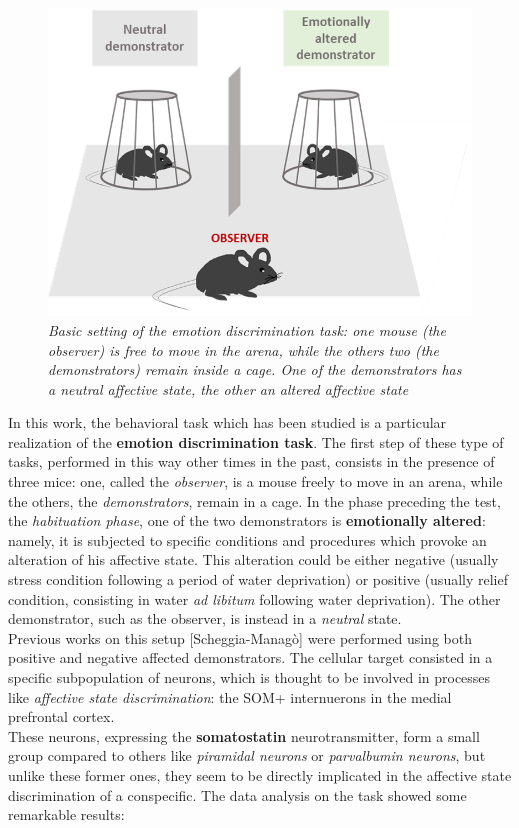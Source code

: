 \documentclass[a4paper]{article}
\begin{document}
\begin{figure}
	\begin{center}
		\includegraphics[scale=.60]{mice_task.png} 
	\end{center} 
	\caption{\textit{Basic setting of the emotion discrimination task: one mouse (the \textit{observer}) is free to move in the arena, while the others two (the \textit{demonstrators}) remain inside a cage. One of the demonstrators has a neutral affective state, the other an altered affective state}}
	
\end{figure}
In this work, the behavioral task which has been studied is a particular realization of the \textbf{emotion discrimination task}. The first step of these type of tasks, performed in this way other times in the past, consists in the presence of three mice: one, called the \textit{observer}, is a mouse freely to move in an arena, while the others, the \textit{demonstrators}, remain in a cage. In the phase preceding the test, the \textit{habituation phase}, one of the two demonstrators is \textbf{emotionally altered}: namely, it is subjected to specific conditions and procedures which provoke an alteration of his affective state. This alteration could be either negative (usually stress condition following a period of water deprivation) or positive (usually relief condition, consisting in water \textit{ad libitum} following water deprivation). The other demonstrator, such as the observer, is instead in a \textit{neutral} state.\\

Previous works on this setup [Scheggia-Managò] were performed using both positive and negative affected demonstrators. The cellular target consisted in a specific subpopulation of neurons, which is thought to be involved in processes like \textit{affective state discrimination}: the SOM+ internuerons in the medial prefrontal cortex.\\
These neurons, expressing the \textbf{somatostatin} neurotransmitter, form a small group compared to others like \textit{piramidal neurons} or \textit{parvalbumin neurons}, but unlike these former ones, they seem to be directly implicated in the affective state discrimination of a conspecific. The data analysis on the task showed some remarkable results:
\end{document}

